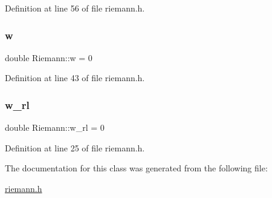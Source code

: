 Definition at line 56 of file riemann.\+h.

\mbox{\label{classRiemann_ac190f84c73f0feb3de1c841166037d39}} 
\subsubsection{\texorpdfstring{w}{w}}
{\footnotesize\ttfamily double Riemann\+::w = 0\hspace{0.3cm}{\ttfamily [private]}}



Definition at line 43 of file riemann.\+h.

\mbox{\label{classRiemann_a0c306a29f08c6eb4814723fb2778224c}} 
\subsubsection{\texorpdfstring{w\+\_\+rl}{w\_rl}}
{\footnotesize\ttfamily double Riemann\+::w\+\_\+rl = 0\hspace{0.3cm}{\ttfamily [private]}}



Definition at line 25 of file riemann.\+h.



The documentation for this class was generated from the following file\+:\begin{DoxyCompactItemize}
\item 
\hyperlink{riemann_8h}{riemann.\+h}\end{DoxyCompactItemize}
